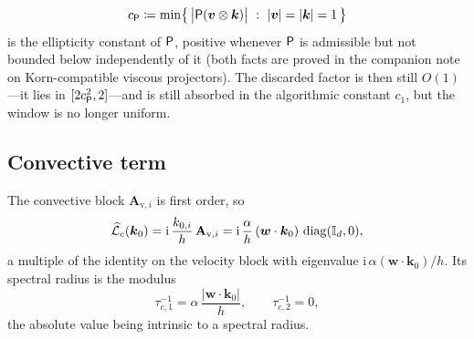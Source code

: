 \begin{remark}
\begin{equation}\label{eq:cPi}
  c_{\ViscProj}\coloneqq\min\bigl\{\,\bigl|\ViscProj(\boldsymbol{v}\otimes\boldsymbol{k})\bigr|\ :\ |\boldsymbol{v}|=|\boldsymbol{k}|=1\,\bigr\}
\end{equation}
is the ellipticity constant of $\mathsf{P}$, positive whenever $\mathsf{P}$ is admissible but not bounded below independently of it (both facts are proved in the companion note on Korn{\hyp}compatible viscous projectors). The discarded factor is then still $O(1)$---it lies in $[2c_{\mathsf{P}}^2,2]$---and is still absorbed in the algorithmic constant $c_1$, but the window is no longer uniform.
\end{remark}

\subsection{Convective term}\label{sec:ftConvective}
The convective block $\mathbf{A}_{\mathrm{v},i}$ is first order, so
\begin{equation}\label{eq:ftConvSymbol}
  \widehat{\mathcal{L}}_{c}(\boldsymbol{k}_0)
  = \mathrm{i}\,\frac{k_{0,i}}{h}\,\mathbf{A}_{\mathrm{v},i}
  = \mathrm{i}\,\frac{\alpha}{h}\,(\boldsymbol{w}\cdot\boldsymbol{k}_0)\,\operatorname{diag}(\mathbb{I}_d,0),
\end{equation}
a multiple of the identity on the velocity block with eigenvalue $\mathrm{i}\,\alpha(\boldsymbol{w}\cdot\boldsymbol{k}_0)/h$. Its spectral radius is the modulus
\begin{equation}\label{eq:ftTauC}
  \tau_{c,1}^{-1} = \alpha\,\frac{|\boldsymbol{w}\cdot\boldsymbol{k}_0|}{h},\qquad \tau_{c,2}^{-1}=0,
\end{equation}
the absolute value being intrinsic to a spectral radius.


